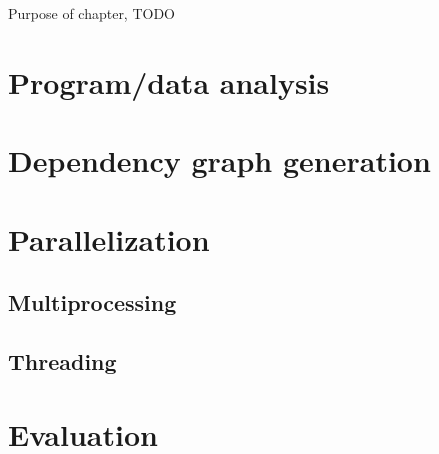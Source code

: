 Purpose of chapter, TODO

\section{Program/data analysis}

\section{Dependency graph generation}

\section{Parallelization}

\subsection{Multiprocessing}

\subsection{Threading}

\section{Evaluation}